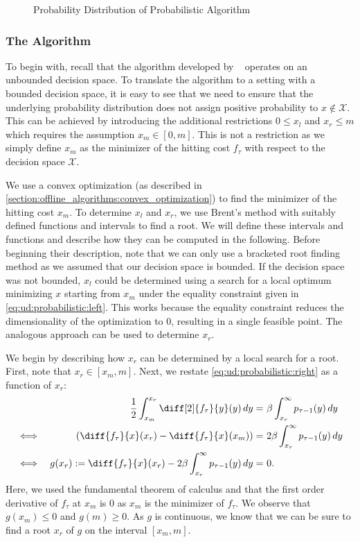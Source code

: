 \begin{figure}
    \centering
    [TODO]

    \caption{Probability Distribution of Probabilistic Algorithm}
    \label{fig:probability_distribution_of_probabilistic_algorithm}
\end{figure}

\subsubsection{The Algorithm}

To begin with, recall that the algorithm developed by \citeauthor*{Bansal2015}~\cite{Bansal2015} operates on an unbounded decision space. To translate the algorithm to a setting with a bounded decision space, it is easy to see that we need to ensure that the underlying probability distribution does not assign positive probability to $x \not\in \mathcal{X}$. This can be achieved by introducing the additional restrictions $0 \leq x_l$ and $x_r \leq m$ which requires the assumption $x_m \in [0,m]$. This is not a restriction as we simply define $x_m$ as the minimizer of the hitting cost $f_{\tau}$ with respect to the decision space $\mathcal{X}$.

We use a convex optimization (as described in \cref{section:offline_algorithms:convex_optimization}) to find the minimizer of the hitting cost $x_m$. To determine $x_l$ and $x_r$, we use Brent's method with suitably defined functions and intervals to find a root. We will define these intervals and functions and describe how they can be computed in the following. Before beginning their description, note that we can only use a bracketed root finding method as we assumed that our decision space is bounded. If the decision space was not bounded, $x_l$ could be determined using a search for a local optimum minimizing $x$ starting from $x_m$ under the equality constraint given in \cref{eq:ud:probabilistic:left}. This works because the equality constraint reduces the dimensionality of the optimization to $0$, resulting in a single feasible point. The analogous approach can be used to determine $x_r$.

We begin by describing how $x_r$ can be determined by a local search for a root. First, note that $x_r \in [x_m,m]$. Next, we restate \cref{eq:ud:probabilistic:right} as a function of $x_r$: \begin{align*}
    && \frac{1}{2} \int_{x_m}^{x_r} \diff[2]{f_{\tau}}{y}(y) \,dy =&\ \beta \int_{x_r}^{\infty} p_{\tau-1}(y) \,dy \\
    \iff&& \left(\diff{f_{\tau}}{x}(x_r) - \diff{f_{\tau}}{x}(x_m)\right) =&\ 2 \beta \int_{x_r}^{\infty} p_{\tau-1}(y) \,dy \\
    \iff&& g(x_r) := \diff{f_{\tau}}{x}(x_r) - 2 \beta \int_{x_r}^{\infty} p_{\tau-1}(y) \,dy =&\ 0.
\end{align*} Here, we used the fundamental theorem of calculus and that the first order derivative of $f_{\tau}$ at $x_m$ is $0$ as $x_m$ is the minimizer of $f_{\tau}$. We observe that $g(x_m) \leq 0$ and $g(m) \geq 0$. As $g$ is continuous, we know that we can be sure to find a root $x_r$ of $g$ on the interval $[x_m,m]$.

